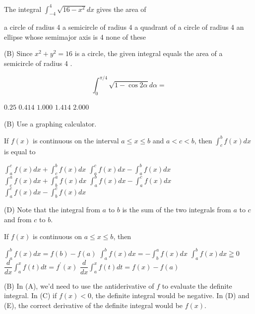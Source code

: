 \question
The integral $\int_{-4}^{4} \sqrt{16-x^{2}} d x$ gives the area of
\begin{choices}
  \choice a circle of radius 4
  \CorrectChoice a semicircle of radius 4
  \choice a quadrant of a circle of radius 4
  \choice an ellipse whose semimajor axis is 4
  \choice none of these
\end{choices}
\begin{solution}
(B) Since $x^{2}+y^{2}=16$ is a circle, the given integral equals the area of a semicircle of radius 4 .
\end{solution}



\newpage




\question
\[
\int_{0}^{\pi / 4} \sqrt{1-\cos 2 \alpha} d \alpha=
\]
\begin{choices}
  \choice $0.25$
  \CorrectChoice $0.414$
  \choice $1.000$
  \choice $1.414$
  \choice $2.000$
\end{choices}
\begin{solution}
(B) Use a graphing calculator.
\end{solution}

\question
If $f(x)$ is continuous on the interval $a \leq x \leq b$ and $a<c<b$, then $\int_{c}^{b} f(x) d x$ is equal to
\begin{choices}
  \choice $\int_{a}^{c} f(x) d x+\int_{c}^{b} f(x) d x$
  \choice $\int_{a}^{c} f(x) d x-\int_{a}^{b} f(x) d x$
  \choice $\int_{c}^{a} f(x) d x+\int_{b}^{a} f(x) d x$
  \CorrectChoice $\int_{a}^{b} f(x) d x-\int_{a}^{c} f(x) d x$
  \choice $\int_{a}^{c} f(x) d x-\int_{b}^{c} f(x) d x$
\end{choices}
\begin{solution}
(D) Note that the integral from $a$ to $b$ is the sum of the two integrals from $a$ to $c$ and from $c$ to $b$.
\end{solution}

\question
If $f(x)$ is continuous on $a \leq x \leq b$, then
\begin{choices}
  \choice $\int_{a}^{b} f(x) d x=f(b)-f(a)$
  \CorrectChoice $\int_{a}^{b} f(x) d x=-\int_{b}^{a} f(x) d x$
  \choice $\int_{a}^{b} f(x) d x \geqq 0$
  \choice $\dfrac{d}{d x} \int_{a}^{x} f(t) d t=f^{\prime}(x)$
  \choice $\dfrac{d}{d x} \int_{a}^{x} f(t) d t=f(x)-f(a)$
\end{choices}
\begin{solution}
(B) In (A), we'd need to use the antiderivative of $f$ to evaluate the definite integral. In (C) if $f(x)<0$, the definite integral would be negative. In (D) and (E), the correct derivative of the definite integral would be $f(x)$.
\end{solution}




